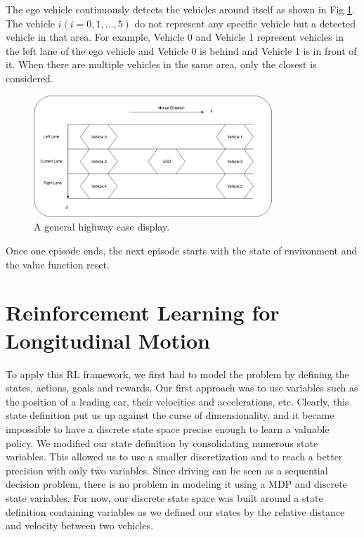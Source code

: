 The ego vehicle continuously detects the vehicles around itself as shown in Fig \ref{fig:highway}. The vehicle $i (i = 0,1,...,5)$ do not represent any specific vehicle but a detected vehicle in that area. For example, Vehicle 0 and Vehicle 1 represent vehicles in the left lane of the ego vehicle and Vehicle 0 is behind and Vehicle 1 is in front of it. When there are multiple vehicles in the same area, only the closest is considered. 

\begin{figure}[h]
\centering
\includegraphics[width=0.8\textwidth]{figs/ch4/Highway-Display}
\caption{A general highway case display.}
\label{fig:highway}
\end{figure}

Once one episode ends, the next episode starts with the state of environment and the value function reset.

\section{Reinforcement Learning for Longitudinal Motion}

To apply this RL framework, we first had to model the problem by defining the states, actions, goals and rewards. Our first approach was to use variables such as the position of a leading car, their velocities and accelerations, etc. Clearly, this state definition put us up against the curse of dimensionality, and it became impossible to have a discrete state space precise enough to learn a valuable policy. We modified our state definition by consolidating numerous state variables. This allowed us to use a smaller discretization and to reach a better precision with only two variables. Since driving can be seen as a sequential decision problem, there is no problem in modeling it using a MDP and discrete state variables. For now, our discrete state space was built around a state definition containing variables as we defined our states by the relative distance and velocity between two vehicles.

